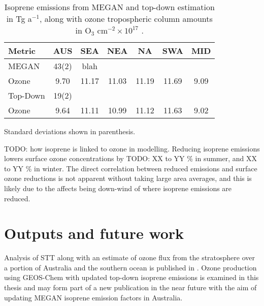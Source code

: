   \begin{table}\begin{threeparttable}
    \caption{Isoprene emissions from MEGAN and top-down estimation in Tg a$^{-1}$, along with ozone tropospheric column amounts in O$_3$ cm$^{-2} \times 10^{17}$ .}
    \begin{tabular}{ l c c c c c c } 
      \toprule
      Metric & AUS & SEA & NEA & NA & SWA & MID \\
      \midrule
      MEGAN & 43(2) & blah &  &  & & \\
      Ozone & 9.70 & 11.17 & 11.03 & 11.19 & 11.69 & 9.09 \\
      \midrule
      Top-Down & 19(2) & & & & & \\
      Ozone & 9.64 & 11.11 & 10.99 & 11.12 & 11.63 & 9.02 \\
      \bottomrule
    \end{tabular}
    \begin{tablenotes}
      \item Standard deviations shown in parenthesis.
    \end{tablenotes}
    \label{Conclusions:ozone:tab_emissions_vs_ozone}
  \end{threeparttable}\end{table}

  
  TODO: how isoprene is linked to ozone in modelling. 
  Reducing isoprene emissions lowers surface ozone concentrations by TODO: XX to YY \% in summer, and XX to YY \% in winter.
  The direct correlation between reduced emissions and surface ozone reductions is not apparent without taking large area averages, and this is likely due to the affects being down-wind of where isoprene emissions are reduced. 

  
\section{Outputs and future work}
\label{Conclusions:future}
  
  Analysis of STT along with an estimate of ozone flux from the stratosphere over a portion of Australia and the southern ocean is published in \textcite{Greenslade2017}.
  Ozone production using GEOS-Chem with updated top-down isoprene emissions is examined in this thesis and may form part of a new publication in the near future with the aim of updating MEGAN isoprene emission factors in Australia.
  
